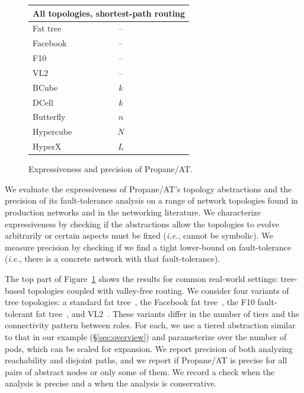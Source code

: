 \documentclass[numbers, 10pt]{sigplanconf}
\newcommand{\IE}{\emph{i.e.}}
\newcommand{\sysname}{{\text{}\small \sf Propane/AT}\xspace}
\newcommand{\Conserv}{\cal{C}}
\newcommand{\cmark}{\ding{51}}
\newcommand{\xmark}{\ding{55}}
\begin{document}
\begin{figure}[t!]
\begin{center}
\begin{tabular}{| l | c| c | c | c | c | }
      \multicolumn{6}{l}{\textbf{All topologies, shortest-path routing}} \\ \hline

      Fat tree~\cite{fattree} & -- & \cmark & \cmark & \cmark & \Conserv  \\ \hline
      Facebook~\cite{facebook-fattree} & -- & \cmark & \cmark & \cmark & \cmark \\ \hline
      F10~\cite{f10-fattree} & -- & \cmark & \cmark & \cmark & \Conserv \\ \hline
      VL2~\cite{vl2-fattree} & -- & \cmark & \cmark & \cmark & \Conserv \\ \hline
      BCube~\cite{bcube} & $k$ & \cmark & \cmark & \Conserv & \Conserv \\ \hline
      DCell~\cite{dcell} & $k$ & \cmark & \cmark & \Conserv & \Conserv \\ \hline
      Butterfly~\cite{butterfly} & $n$ & \cmark & \cmark & \cmark & \cmark \\ \hline
      Hypercube & $N$ & \cmark & \cmark & \cmark & \cmark \\ \hline
      HyperX~\cite{hyperx} & $L$ & \cmark & \cmark & \cmark & \cmark \\ \hline
      \end{tabular}
  \end{center}
  \vspace{-.8em}
  \caption{Expressiveness and precision of \sysname.}
  \label{fig:analysis-precision}
  \vspace{-.8em}
\end{figure}


We evaluate the expressiveness of \sysname's topology abstractions and the precision of its fault-tolerance analysis on a range of network topologies found in production networks and in the networking literature. We characterize expressiveness by checking if the abstractions allow the topologies to evolve arbitrarily or certain aspects must be fixed (\IE, cannot be symbolic). We measure precision by checking if we find a tight lower-bound on fault-tolerance (\IE, there is a concrete network with that fault-tolerance).

The top part of Figure~\ref{fig:analysis-precision} shows the results for common real-world settings: tree-based topologies coupled with valley-free routing.
We consider four variants of tree topologies: a standard fat tree~\cite{fattree}, the Facebook fat tree~\cite{facebook-fattree}, the F10 fault-tolerant fat tree~\cite{f10-fattree}, and VL2~\cite{vl2-fattree}. These variants differ in the number of tiers and the connectivity pattern between roles. For each, we use a tiered abstraction similar to that in our example (\S\ref{sec:overview}) and parameterize over the number of pods, which can be scaled for expansion. We report precision of both analyzing reachability and disjoint paths, and we report if \sysname is precise for all pairs of abstract nodes or only some of them. We record a check when the analysis is precise and a \Conserv{} when the analysis is conservative.
\end{document}
